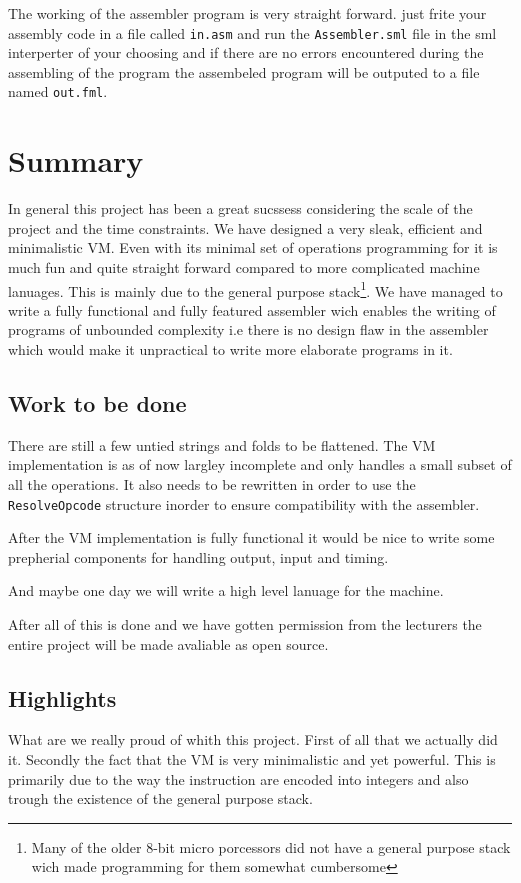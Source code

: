 \documentclass{article}
\newcommand{\V}{\verb}
\begin{document}
The working of the assembler program is very straight forward. just frite your
assembly code in a file called \V+in.asm+ and run the \V+Assembler.sml+ file in
the sml interperter of your choosing and if there are no errors encountered during
the assembling of the program the assembeled program will be outputed to a file
named \V+out.fml+.

\section{Summary}
In general this project has been a great sucssess considering the scale of the
project and the time constraints. We have designed a very sleak, efficient and
minimalistic VM. Even with its minimal set of operations programming for it is
much fun and quite straight forward compared to more complicated machine
lanuages. This is mainly due to the general purpose stack\footnote{Many of the
older 8-bit micro porcessors did not have a general purpose stack wich made
programming for them somewhat cumbersome}.
We have managed to write a fully functional and fully featured assembler wich
enables the writing of programs of unbounded complexity i.e there is no design
flaw in the assembler which would make it unpractical to write more elaborate
programs in it.
\subsection{Work to be done}
There are still a few untied strings and folds to be flattened. The VM
implementation is as of now largley incomplete and only handles a small subset
of all the operations. It also needs to be rewritten in order to use the
\V+ResolveOpcode+ structure inorder to ensure compatibility with the assembler.

After the VM implementation is fully functional it would be nice to write some
prepherial components for handling output, input and timing.

And maybe one day we will write a high level lanuage for the machine.

After all of this is done and we have gotten permission from the lecturers the
entire project will be made avaliable as open source.
\subsection{Highlights}
What are we really proud of whith this project. First of all that we actually
did it. Secondly the fact that the VM is very minimalistic and yet powerful.
This is primarily due to the way the instruction are encoded into integers and
also trough the existence of the general purpose stack.
\end{document}
